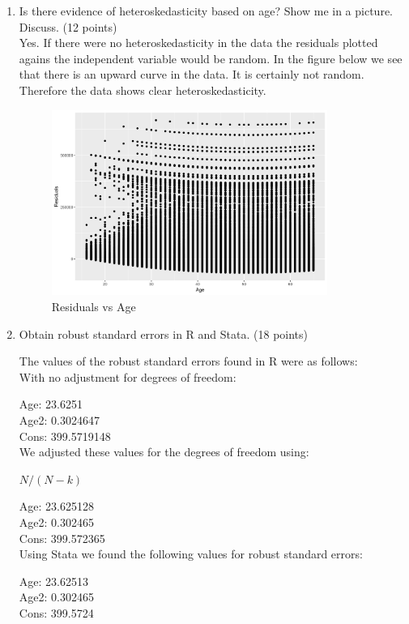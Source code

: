 \documentclass{article}
\begin{document}
\begin{enumerate}[label=\alph*]

\item Is there evidence of heteroskedasticity based on age? Show me in a picture.
Discuss. (12 points)\\

Yes.  If there were no heteroskedasticity in the data the residuals plotted agains the independent variable would be random.  In the figure below we see that there is an upward curve in the data.  It is certainly not random.  Therefore the data shows clear heteroskedasticity.


\begin{figure}[ht!]
\centering
\includegraphics[width=90mm]{residuals.png}
\caption{Residuals vs Age \label{overflow}}
\end{figure}


\item Obtain robust standard errors in R and Stata. (18 points)

The values of the robust standard errors found in R were as follows:\\
With no adjustment for degrees of freedom:

Age:  23.6251\\
Age2:  0.3024647\\
Cons:  399.5719148\\

We adjusted these values for the degrees of freedom using:

$ N/(N-k)$

Age:  23.625128\\
Age2:  0.302465 \\
Cons:  399.572365\\

Using Stata we found the following values for robust standard errors:

Age:  23.62513\\
Age2:  0.302465 \\
Cons:  399.5724\\

\end{enumerate}
\end{document}
